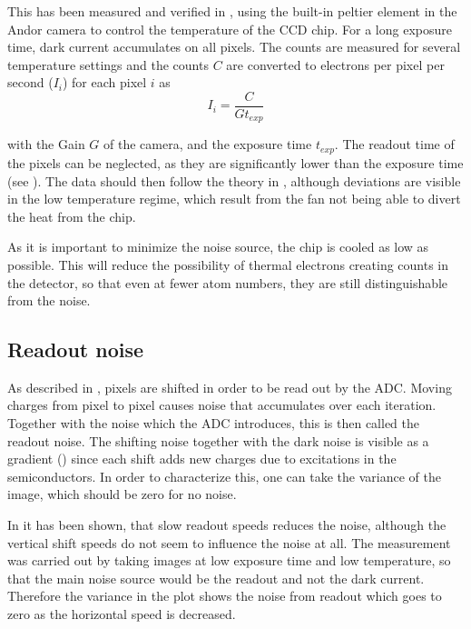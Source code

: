 This has been measured and verified in , using the built-in peltier element in the Andor camera to control the temperature of the CCD chip. For a long exposure time, dark current accumulates on all pixels. The counts are measured for several temperature settings and the counts $C$ are converted to electrons per pixel per second ($I_i$)\cite{Ottenstein2006} for each pixel $i$ as
\begin{equation}
I_{i} = \frac{C}{G t_{exp}}
\end{equation}


with the Gain $G$ of the camera, and the exposure time $t_{exp}$. The readout time of the pixels can be neglected, as they are significantly lower than the exposure time (see ).
The data should then follow the theory in , although deviations are visible in the low temperature regime, which result from the fan not being able to divert the heat from the chip.

As it is important to minimize the noise source, the chip is cooled as low as possible. This will reduce the possibility of thermal electrons creating counts in the detector, so that even at fewer atom numbers, they are still distinguishable from the noise.

\subsection{Readout noise}
As described in , pixels are shifted in order to be read out by the ADC. Moving charges from pixel to pixel causes noise that accumulates over each iteration. Together with the noise which the ADC introduces, this is then called the readout noise. The shifting noise together with the dark noise is visible as a gradient () since each shift adds new charges due to excitations in the semiconductors. In order to characterize this, one can take the variance of the image, which should be zero for no noise.

In  it has been shown, that slow readout speeds reduces the noise, although the vertical shift speeds do not seem to influence the noise at all. The measurement was carried out by taking images at low exposure time and low temperature, so that the main noise source would be the readout and not the dark current. Therefore the variance in the plot shows the noise from readout which goes to zero as the horizontal speed is decreased.

